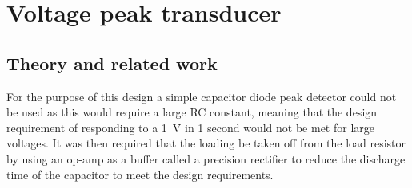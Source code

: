\chapter{Voltage peak transducer}
\section{Theory and related work} \label{sec:literature_voltage_peak_transducer}
For the purpose of this design a simple capacitor diode peak detector could not be used as this would require a large RC constant, meaning that the design requirement of responding to a \SI{1}{V} in 1 second would not be met for large voltages. It was then required that the loading be taken off from the load resistor by using an op-amp as a buffer called a precision rectifier to reduce the discharge time of the capacitor to meet the design requirements. 

